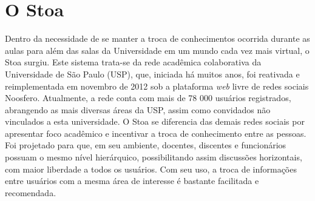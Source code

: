





\section{O Stoa}
\label{sec:stoa}
    Dentro da necessidade de se manter a troca de conhecimentos ocorrida durante as aulas para além das salas da Universidade em um mundo cada vez mais virtual, o Stoa\cite{stoa} surgiu. Este sistema trata-se da rede acadêmica colaborativa da Universidade de São Paulo (USP), que, iniciada há muitos anos, foi reativada e reimplementada em novembro de 2012 sob a plataforma \emph{web} livre de redes sociais Noosfero\cite{noosfero}. Atualmente, a rede conta com mais de 78 000 usuários registrados, abrangendo as mais diversas áreas da USP, assim como convidados não vinculados a esta universidade.
    O Stoa se diferencia das demais redes sociais por apresentar foco acadêmico e incentivar a troca de conhecimento entre as pessoas. Foi projetado para que, em seu ambiente, docentes, discentes e funcionários possuam o mesmo nível hierárquico, possibilitando assim discussões horizontais, com maior liberdade a todos os usuários. Com seu uso, a troca de informações entre usuários com a mesma área de interesse é bastante facilitada e recomendada.

